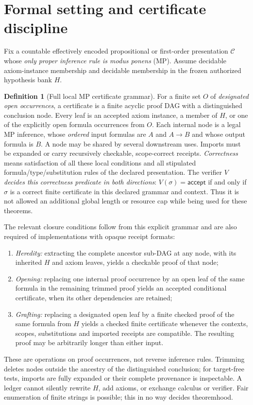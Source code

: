 \documentclass[11pt,letterpaper]{article}
\theoremstyle{definition}
\newtheorem{definition}[theorem]{Definition}
\newcommand{\C}{\mathcal C}
\begin{document}
\section{Formal setting and certificate discipline}
Fix a countable effectively encoded propositional or first-order presentation
$\C$ whose \emph{only proper inference rule is modus ponens} (MP).
Assume decidable axiom-instance membership and decidable membership in the
frozen authorized hypothesis bank $H$.

\begin{definition}[Full local MP certificate grammar]\label{def:grammar}
For a finite set $O$ of \emph{designated open occurrences}, a certificate is a
finite acyclic proof DAG with a distinguished conclusion node. Every leaf is
an accepted axiom instance, a member of $H$, or one of the explicitly open
formula occurrences from $O$. Each internal node is a legal MP inference,
whose \emph{ordered} input formulas are $A$ and $A\to B$ and whose output
formula is $B$. A node may be shared by several downstream uses. Imports
must be expanded or carry recursively checkable, scope-correct receipts.
\emph{Correctness} means satisfaction of all these local conditions and
all stipulated formula/type/substitution rules of the declared presentation.
The verifier $V$ \emph{decides this correctness predicate in both directions}:
$V(\sigma)=\mathsf{accept}$ if and only if $\sigma$ is a correct finite
certificate in this declared grammar and context. Thus it is not allowed
an additional global length or resource cap while being used for these theorems.
\end{definition}

The relevant closure conditions follow from this explicit grammar and are
also required of implementations with opaque receipt formats:
\begin{enumerate}[label=(\roman*)]
\item \emph{Heredity:} extracting the complete ancestor sub-DAG at any node,
with its inherited $H$ and axiom leaves, yields a checkable proof of that node;
\item \emph{Opening:} replacing one internal proof occurrence by an open leaf
of the same formula in the remaining trimmed proof yields an accepted
conditional certificate, when its other dependencies are retained;
\item \emph{Grafting:} replacing a designated open leaf by a finite checked
proof of the same formula from $H$ yields a checked finite certificate
whenever the contexts, scopes, substitutions and imported receipts are
compatible. The resulting proof may be arbitrarily longer than either input.
\end{enumerate}
These are operations on proof occurrences, not reverse inference rules.
Trimming deletes nodes outside the ancestry of the distinguished conclusion;
for target-free tests, imports are fully expanded or their complete provenance
is inspectable. A ledger cannot silently rewrite $H$, add axioms, or exchange
calculus or verifier. Fair enumeration of finite strings is possible; this
in no way decides theoremhood.
\end{document}
